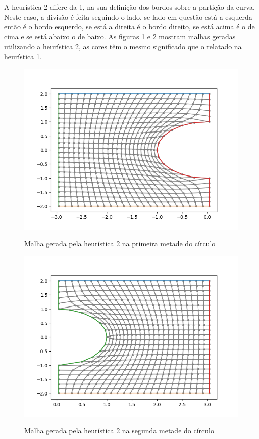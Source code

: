 \documentclass[a4paper]{article}
\begin{document}
A heurística 2 difere da 1, na sua definição dos bordos sobre a partição da curva. Neste caso, a divisão é feita seguindo o lado, se lado em questão está a esquerda então é o bordo esquerdo, se está a direita é o bordo direito, se está acima é o de cima e se está abaixo o de baixo.
As figuras \ref{fig:heuristic2_top1} e \ref{fig:heuristic2_top2} mostram malhas geradas utilizando a heurística 2, as cores têm o mesmo significado que o relatado na heurística 1.

\begin{figure}[h]
	\centering
	\includegraphics[width=1.0\textwidth]{heuristica_2_25pts_top1.png}
	\label{fig:heuristic2_top1} 
	\caption[caption]{Malha gerada pela heurística 2 na primeira metade do círculo}
\end{figure}


\begin{figure}[h]
	\centering
	\includegraphics[width=1.0\textwidth]{heuristica_2_25pts_top2.png}
	\label{fig:heuristic2_top2} 
	\caption[caption]{Malha gerada pela heurística 2 na segunda metade do círculo}
\end{figure}
\end{document}

